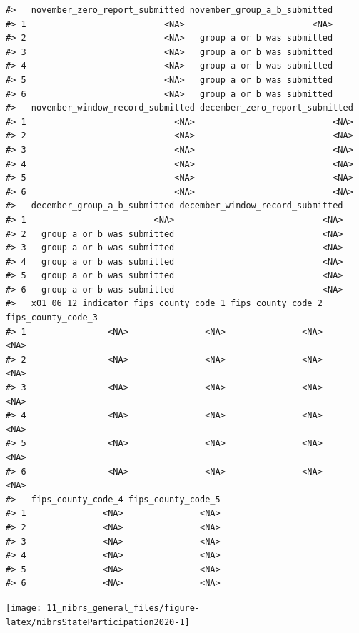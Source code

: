 \documentclass[
]{krantz}
\let\origfigure\figure
\let\endorigfigure\endfigure
\renewenvironment{figure}[1][2] {
    \expandafter\origfigure\expandafter[H]
} {
    \endorigfigure
}
\begin{document}
\begin{verbatim}
#>   november_zero_report_submitted november_group_a_b_submitted
#> 1                           <NA>                         <NA>
#> 2                           <NA>   group a or b was submitted
#> 3                           <NA>   group a or b was submitted
#> 4                           <NA>   group a or b was submitted
#> 5                           <NA>   group a or b was submitted
#> 6                           <NA>   group a or b was submitted
#>   november_window_record_submitted december_zero_report_submitted
#> 1                             <NA>                           <NA>
#> 2                             <NA>                           <NA>
#> 3                             <NA>                           <NA>
#> 4                             <NA>                           <NA>
#> 5                             <NA>                           <NA>
#> 6                             <NA>                           <NA>
#>   december_group_a_b_submitted december_window_record_submitted
#> 1                         <NA>                             <NA>
#> 2   group a or b was submitted                             <NA>
#> 3   group a or b was submitted                             <NA>
#> 4   group a or b was submitted                             <NA>
#> 5   group a or b was submitted                             <NA>
#> 6   group a or b was submitted                             <NA>
#>   x01_06_12_indicator fips_county_code_1 fips_county_code_2 fips_county_code_3
#> 1                <NA>               <NA>               <NA>               <NA>
#> 2                <NA>               <NA>               <NA>               <NA>
#> 3                <NA>               <NA>               <NA>               <NA>
#> 4                <NA>               <NA>               <NA>               <NA>
#> 5                <NA>               <NA>               <NA>               <NA>
#> 6                <NA>               <NA>               <NA>               <NA>
#>   fips_county_code_4 fips_county_code_5
#> 1               <NA>               <NA>
#> 2               <NA>               <NA>
#> 3               <NA>               <NA>
#> 4               <NA>               <NA>
#> 5               <NA>               <NA>
#> 6               <NA>               <NA>
\end{verbatim}

\begin{figure}

{\centering \texttt{[image: 11\_nibrs\_general\_files/figure-latex/nibrsStateParticipation2020-1]} 

}

\caption{The percent of each state's population that is covered by police agencies reporting at least one month of data to NIBRS, 2022.}\label{fig:nibrsStateParticipation2020}
\end{figure}
\end{document}
